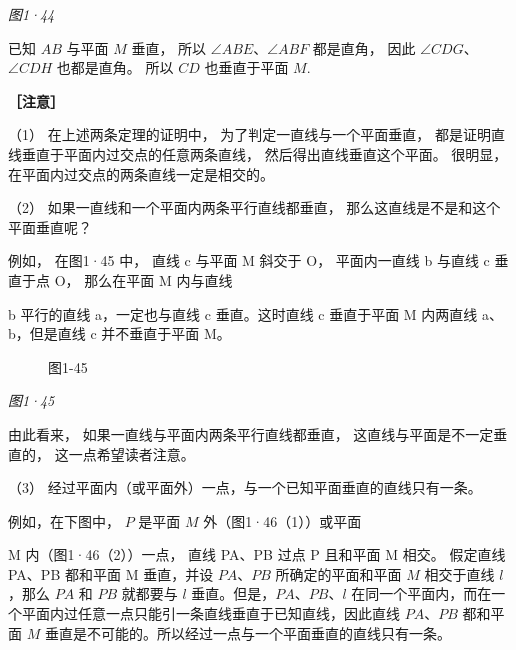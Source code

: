 \emph{图1·44}

已知 \(AB\) 与平面 \(M\) 垂直， 所以 \(\angle ABE\)、\(\angle ABF\)
都是直角， 因此 \(\angle CDG\)、\(\angle CDH\) 也都是直角。 所以 \(CD\)
也垂直于平面 \(M\).

\textbf{［注意］}

（1） 在上述两条定理的证明中， 为了判定一直线与一个平面垂直，
都是证明直线垂直于平面内过交点的任意两条直线，
然后得出直线垂直这个平面。 很明显，
在平面内过交点的两条直线一定是相交的。

（2） 如果一直线和一个平面内两条平行直线都垂直，
那么这直线是不是和这个平面垂直呢？

例如， 在图1·45 中， 直线 c 与平面 M 斜交于 O， 平面内一直线 b 与直线 c
垂直于点 O， 那么在平面 M 内与直线

b 平行的直线 a，一定也与直线 c 垂直。这时直线 c 垂直于平面 M 内两直线
a、b，但是直线 c 并不垂直于平面 M。

\begin{figure}
\centering
{}
\caption{图1-45}
\end{figure}

\emph{图1·45}

由此看来， 如果一直线与平面内两条平行直线都垂直，
这直线与平面是不一定垂直的， 这一点希望读者注意。

（3） 经过平面内（或平面外）一点，与一个已知平面垂直的直线只有一条。

例如，在下图中， \(P\) 是平面 \(M\) 外（图1·46（1））或平面

M 内（图1·46（2））一点， 直线 PA、PB 过点 P 且和平面 M 相交。 假定直线
PA、PB 都和平面 M 垂直，并设 \(PA\)、\(PB\) 所确定的平面和平面 \(M\)
相交于直线 \(l\)，那么 \(PA\) 和 \(PB\) 就都要与 \(l\)
垂直。但是，\(PA\)、\(PB\)、\(l\)
在同一个平面内，而在一个平面内过任意一点只能引一条直线垂直于已知直线，因此直线
\(PA\)、\(PB\) 都和平面 \(M\)
垂直是不可能的。所以经过一点与一个平面垂直的直线只有一条。

